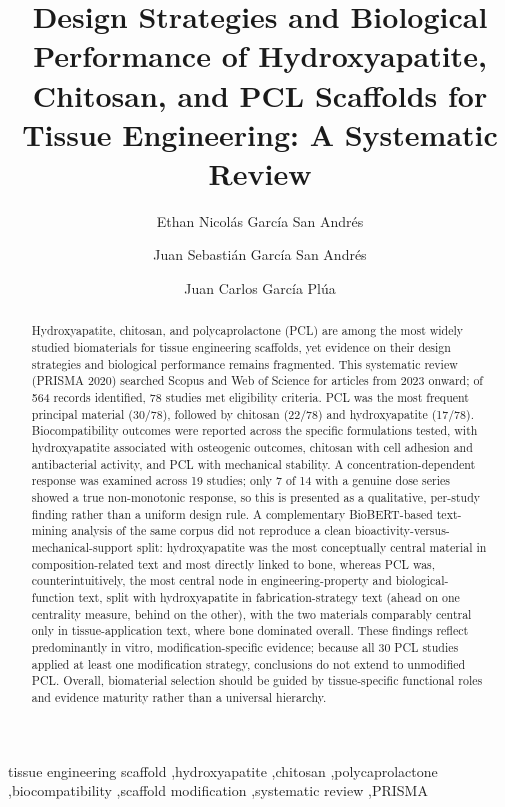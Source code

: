 \documentclass[5p,times,twocolumn]{elsarticle}
\begin{document}
\begin{frontmatter}

\title{Design Strategies and Biological Performance of Hydroxyapatite, Chitosan, and PCL Scaffolds for Tissue Engineering: A Systematic Review}

\author[label1]{Ethan Nicolás García San Andrés}
\author[label2]{Juan Sebastián García San Andrés}
\author[label3]{Juan Carlos García Plúa}

\address[label1]{Universidad Politécnica Salesiana, Guayaquil, Ecuador}
\address[label2]{Alexandria Technical and Community College, Alexandria, Minnesota, United States}
\address[label3]{Universidad de Guayaquil, Guayaquil, Ecuador}

\begin{abstract}
Hydroxyapatite, chitosan, and polycaprolactone (PCL) are among the most widely studied biomaterials for tissue engineering scaffolds, yet evidence on their design strategies and biological performance remains fragmented. This systematic review (PRISMA 2020) searched Scopus and Web of Science for articles from 2023 onward; of 564 records identified, 78 studies met eligibility criteria. PCL was the most frequent principal material (30/78), followed by chitosan (22/78) and hydroxyapatite (17/78). Biocompatibility outcomes were reported across the specific formulations tested, with hydroxyapatite associated with osteogenic outcomes, chitosan with cell adhesion and antibacterial activity, and PCL with mechanical stability. A concentration-dependent response was examined across 19 studies; only 7 of 14 with a genuine dose series showed a true non-monotonic response, so this is presented as a qualitative, per-study finding rather than a uniform design rule. A complementary BioBERT-based text-mining analysis of the same corpus did not reproduce a clean bioactivity-versus-mechanical-support split: hydroxyapatite was the most conceptually central material in composition-related text and most directly linked to bone, whereas PCL was, counterintuitively, the most central node in engineering-property and biological-function text, split with hydroxyapatite in fabrication-strategy text (ahead on one centrality measure, behind on the other), with the two materials comparably central only in tissue-application text, where bone dominated overall. These findings reflect predominantly in vitro, modification-specific evidence; because all 30 PCL studies applied at least one modification strategy, conclusions do not extend to unmodified PCL. Overall, biomaterial selection should be guided by tissue-specific functional roles and evidence maturity rather than a universal hierarchy.
\end{abstract}

\begin{keyword}
tissue engineering scaffold \sep hydroxyapatite \sep chitosan \sep polycaprolactone \sep biocompatibility \sep scaffold modification \sep systematic review \sep PRISMA
\end{keyword}

\end{frontmatter}
\end{document}

